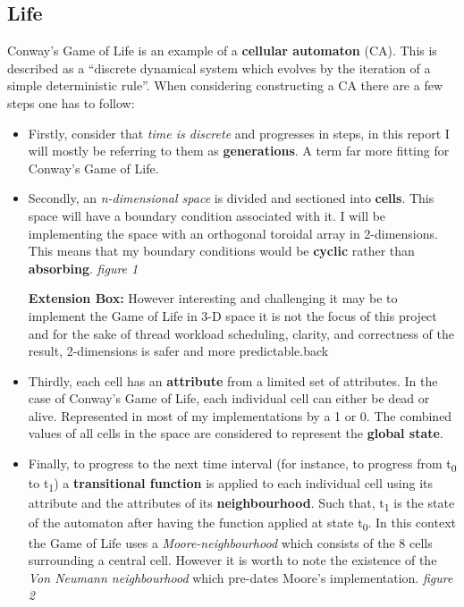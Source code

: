 \documentclass[11pt]{article} %
\begin{document}
\subsection{Life}
Conway's Game of Life is an example of a {\bf cellular automaton} (CA). This is described \cite[Lesser, Wuensche, 1992 p6]{ref6} as a ``discrete dynamical system which evolves by the iteration of a simple deterministic rule''. When considering constructing a CA there are a few steps one has to follow:
\begin{itemize}
\item Firstly, consider that \emph{time is discrete} and progresses in steps, in this report I will mostly be referring to them as {\bf generations}. A term far more fitting for Conway's Game of Life. 
\item Secondly, an \emph{n-dimensional space} is divided and sectioned into {\bf cells}. This space will have a boundary condition associated with it. I will be implementing the space with an orthogonal toroidal array in 2-dimensions. This means that my boundary conditions would be {\bf cyclic} rather than {\bf absorbing}. {\it figure 1}
\begin{mdframed}
{\bf Extension Box:} However interesting and challenging it may be to implement the Game of Life in 3-D space it is not the focus of this project and for the sake of thread workload scheduling, clarity, and correctness of the result, 2-dimensions is safer and more predictable.back
\end{mdframed}
\item Thirdly, each cell has an {\bf attribute} from a limited set of attributes. In the case of Conway's Game of Life, each individual cell can either be dead or alive. Represented in most of my implementations by a 1 or 0. The combined values of all cells in the space are considered to represent the {\bf global state}.
\item Finally, to progress to the next time interval (for instance, to progress from t\textsubscript{0} to t\textsubscript{1}) a {\bf transitional function} is applied to each individual cell using its attribute and the attributes of its {\bf neighbourhood}. Such that, t\textsubscript{1} is the state of the automaton after having the function applied at state t\textsubscript{0}. In this context the Game of Life uses a \emph{Moore-neighbourhood} which consists of the 8 cells surrounding a central cell. However it is worth to note the existence of the \emph{Von Neumann neighbourhood} which pre-dates Moore's implementation. {\it figure 2}
\end{itemize}
\end{document}
